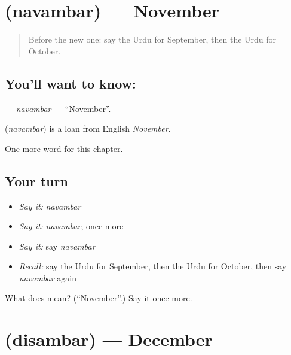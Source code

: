 \section[\texorpdfstring{\ur{نومبر} (navambar)}{نومبر (navambar)}]{ (navambar) — November}

\label{lesson:UR-C218-navambar}



\begin{quote}
Before the new one: say the Urdu for September, then the Urdu for October.
\end{quote}

\subsection*{You'll want to know: }
\textbf{} — \emph{navambar} — \textquotedblleft{}November\textquotedblright{}.

\begin{cousinweb}
\textbf{} (\emph{navambar}) is a loan from English \emph{November}.
\end{cousinweb}

\begin{grammarlens}[title={What you've built}]
One more word for this chapter.
\end{grammarlens}

\subsection*{Your turn}
\begin{itemize}
\raggedright
  \item \emph{Say it:} \emph{navambar}
  \item \emph{Say it:} \emph{navambar}, once more
  \item \emph{Say it:} say \emph{navambar}
  \item \emph{Recall:} say the Urdu for September, then the Urdu for October, then say \emph{navambar} again
\end{itemize}

\begin{tcolorbox}[breakable,colback=teal!4,colframe=teal!35!black,title={Before you move on}]
What does  mean? (\textquotedblleft{}November\textquotedblright{}.) Say it once more.
\end{tcolorbox}
\section[\texorpdfstring{\ur{دسمبر} (disambar)}{دسمبر (disambar)}]{ (disambar) — December}

